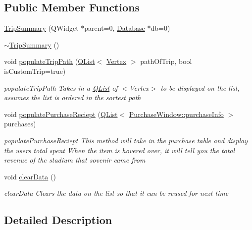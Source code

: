 \subsection*{Public Member Functions}
\begin{DoxyCompactItemize}
\item 
\hyperlink{class_trip_summary_aa8bae5ef064b751299de19a622403431}{Trip\+Summary} (Q\+Widget $\ast$parent=0, \hyperlink{class_database}{Database} $\ast$db=0)
\item 
\hyperlink{class_trip_summary_a6e3c73fb47c7068fe216dd8d0d913586}{$\sim$\+Trip\+Summary} ()
\item 
void \hyperlink{class_trip_summary_ab6f01bddea6c40bd95698fa53e091f18}{populate\+Trip\+Path} (\hyperlink{class_q_list}{Q\+List}$<$ \hyperlink{class_vertex}{Vertex} $>$ path\+Of\+Trip, bool is\+Custom\+Trip=true)
\begin{DoxyCompactList}\small\item\em populate\+Trip\+Path Takes in a \hyperlink{class_q_list}{Q\+List} of $<$\+Vertex$>$ to be displayed on the list, assumes the list is ordered in the sortest path \end{DoxyCompactList}\item 
void \hyperlink{class_trip_summary_a09328d4f72b93d3b33a43d3bb16c1c0d}{populate\+Purchase\+Reciept} (\hyperlink{class_q_list}{Q\+List}$<$ \hyperlink{struct_purchase_window_1_1purchase_info}{Purchase\+Window\+::purchase\+Info} $>$ purchases)
\begin{DoxyCompactList}\small\item\em populate\+Purchase\+Reciept This method will take in the purchase table and display the users total spent When the item is hovered over, it will tell you the total revenue of the stadium that sovenir came from \end{DoxyCompactList}\item 
void \hyperlink{class_trip_summary_afd9cdb3b7cd6f096b896c1d474d3ed54}{clear\+Data} ()
\begin{DoxyCompactList}\small\item\em clear\+Data Clears the data on the list so that it can be reused for next time \end{DoxyCompactList}\end{DoxyCompactItemize}


\subsection{Detailed Description}


